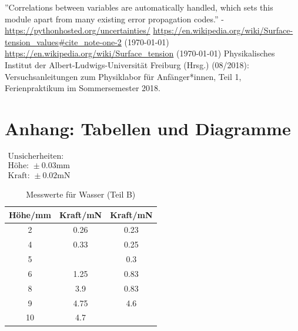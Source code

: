 \documentclass[11pt,a4paper]{article}
\begin{document}
\vfill

\begin{thebibliography}{9}
''Correlations between variables are automatically handled, which sets this module apart from many existing error propagation codes.'' - \url{https://pythonhosted.org/uncertainties/}
 \url{https://en.wikipedia.org/wiki/Surface-tension_values#cite_note-one-2} (\today)
 \url{https://en.wikipedia.org/wiki/Surface_tension} (\today)
 Physikalisches Institut der Albert-Ludwigs-Universität Freiburg (Hrsg.) (08/2018): Versuchsanleitungen zum Physiklabor für Anfänger*innen, Teil 1, Ferienpraktikum im Sommersemester 2018.
\end{thebibliography}

\pagebreak

\section{Anhang: Tabellen und Diagramme}

\begin{table}[h]
\centering
\caption{Messwerte für Wasser (Teil B)} \vspace{11pt}
$\begin{array}{l}
\textrm{Unsicherheiten:}\\
\textrm{Höhe: } \pm 0.03 \textrm{mm}\\
\textrm{Kraft: } \pm 0.02 \textrm{mN}
\end{array}$
\begin{tabular}{ccc}
\toprule
\textrm{H\"ohe}/\textrm{mm}& \textrm{Kraft}/\textrm{mN} & \textrm{Kraft}/\textrm{mN} \\
\midrule 
2 & 0.26 & 0.23\\
\hline
4 & 0.33 & 0.25\\
\hline 
5 & & 0.3\\
\hline 
6 & 1.25 & 0.83\\
\hline 
8 & 3.9 & 0.83\\ 
\hline
9 & 4.75 & 4.6\\ 
\hline
10 & 4.7 &\\ 
\bottomrule
\end{tabular}
\label{tabmw}
\end{table}
\end{document}
